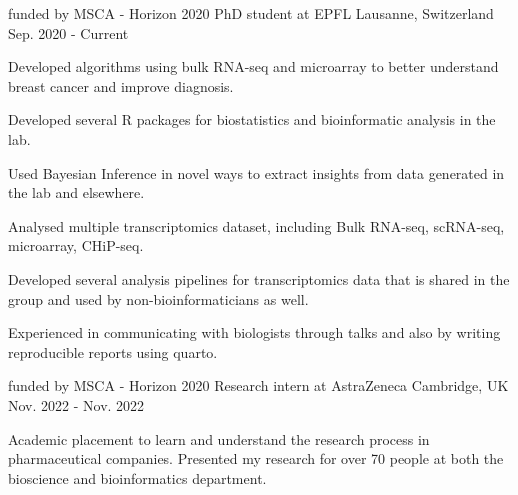 




\begin{cventries}

  \cventry
    {funded by MSCA - Horizon 2020}
    {PhD student at EPFL}
    {Lausanne, Switzerland} 
    {Sep. 2020 - Current} 
    {
      \begin{cvitems} 
        \item {Developed algorithms using bulk RNA-seq and microarray to better
               understand breast cancer and improve diagnosis.}
        \item {Developed several R packages for biostatistics and bioinformatic
                analysis in the lab.} 
        \item {Used Bayesian Inference in novel ways to extract insights from 
               data generated in the lab and elsewhere. }
        \item {Analysed multiple transcriptomics dataset, including 
               Bulk RNA-seq, scRNA-seq, microarray, CHiP-seq.}
        \item { Developed several analysis pipelines for transcriptomics
                data that is shared in the group and used by non-bioinformaticians as well.}
        \item {Experienced in communicating with biologists through talks and also
               by writing reproducible reports using quarto.}
      \end{cvitems} 
    }


\begin{cventries}

  \cventry
    {funded by MSCA - Horizon 2020}
    {Research intern at AstraZeneca}
    {Cambridge, UK} 
    {Nov. 2022 - Nov. 2022} 
    {
      \begin{cvitems} 
        \item {Academic placement to learn and understand the research 
            process in
            pharmaceutical companies. Presented my research for
            over 70 people at both the bioscience and 
            bioinformatics department.}
      \end{cvitems} 
    }
\begin{cventries}


\end{cventries}
\end{cventries}
\end{cventries}
